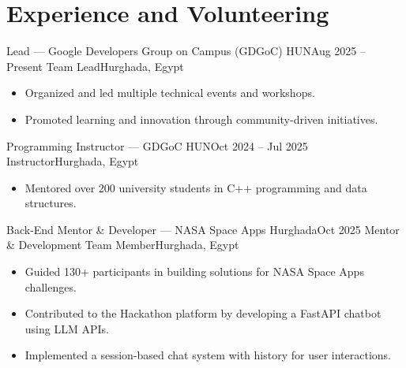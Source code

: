 \section{Experience and Volunteering}
\resumeSubHeadingListStart

\resumeSubheading
{Lead — Google Developers Group on Campus (GDGoC) HUN}{Aug 2025 -- Present}
{Team Lead}{Hurghada, Egypt}
\begin{itemize}
    \item Organized and led multiple technical events and workshops.
    \item Promoted learning and innovation through community-driven initiatives.
\end{itemize}

\resumeSubheading
{Programming Instructor — GDGoC HUN}{Oct 2024 -- Jul 2025}
{Instructor}{Hurghada, Egypt}
\begin{itemize}
    \item Mentored over 200 university students in C++ programming and data structures.

\end{itemize}

\resumeSubheading
{Back-End Mentor \& Developer — NASA Space Apps Hurghada}{Oct 2025}
{Mentor \& Development Team Member}{Hurghada, Egypt}
\begin{itemize}
    \item Guided 130+ participants in building solutions for NASA Space Apps challenges.
    \item Contributed to the Hackathon platform by developing a FastAPI chatbot using LLM APIs.
    \item Implemented a session-based chat system with history for user interactions.
\end{itemize}

\resumeSubHeadingListEnd
